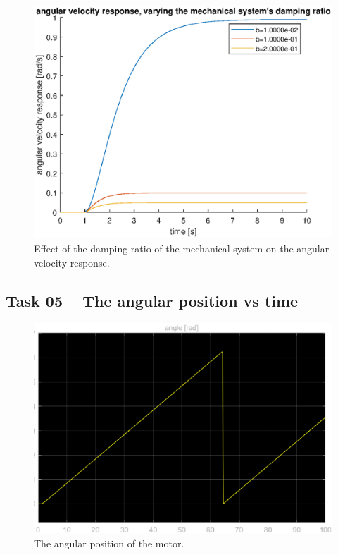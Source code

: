 \documentclass[12pt]{article}
\begin{document}
\begin{figure}
    \centering
    \includegraphics[width=\linewidth]{img/task03b_varying_mechanical_sys_damping_ratio.eps}
    \caption{Effect of the damping ratio of the mechanical system on the angular velocity response.}
    \label{fig:mechanical system damping ratio on angular velocity}
\end{figure}

\subsection{Task 05 -- The angular position vs time}

\begin{figure}
    \centering
    \includegraphics[width=\linewidth]{img/task05_angular_position.eps}
    \caption{The angular position of the motor.}
    \label{fig:angular position of motor}
\end{figure}
\end{document}
